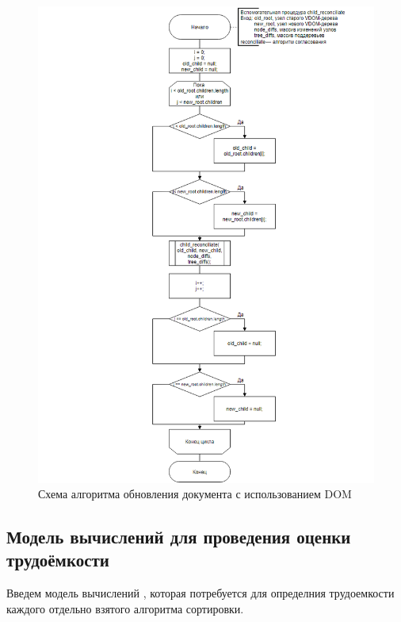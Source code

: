 \begin{figure}[h]
	\centering
	\includegraphics[width=160mm]{img/child-reconciliation-algorithm.png}
	\caption{Схема алгоритма обновления документа с использованием DOM}
	\label{fig:child-reconciliation-algorithm}
\end{figure}

\clearpage

\subsection{Модель вычислений для проведения оценки трудоёмкости}

Введем модель вычислений \cite{model}, которая потребуется для определния трудоемкости каждого отдельно взятого алгоритма сортировки.

